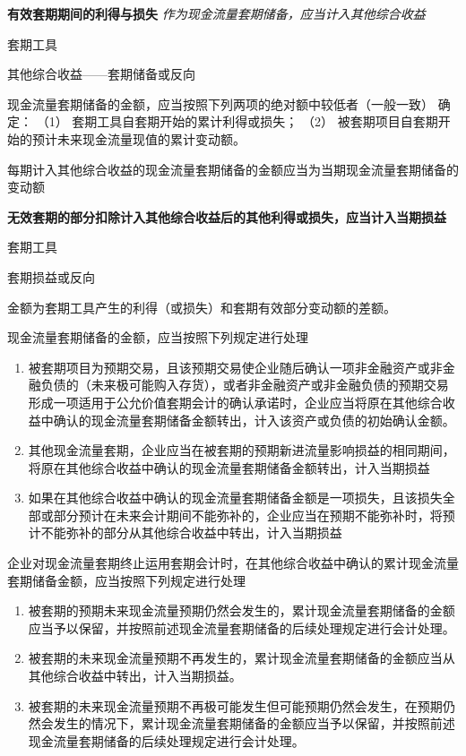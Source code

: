 \documentclass[UTF8,12pt]{ctexart}
\newenvironment{Dr}{%
	\begin{list}{}%
		{
			\setlength{\leftmargin}{2em}
			\setlength{\labelwidth}{2em}
			\setlength{\labelsep}{0pt}
			\setlength{\itemindent}{0pt}
			\setlength{\listparindent}{0pt}
			\setlength{\parsep}{0pt}
			\setlength{\topsep}{0pt}
		}
		\item[\textbf{借：}]
	}{%
	\end{list}
}
\newenvironment{Cr}{%
	\begin{list}{}%
		{
			\setlength{\leftmargin}{2em}
			\setlength{\labelwidth}{2em}
			\setlength{\labelsep}{0pt}
			\setlength{\itemindent}{0pt}
			\setlength{\listparindent}{0pt}
			\setlength{\parsep}{0pt}
			\setlength{\topsep}{0pt}
		}
		\item[\textbf{贷：}]
	}{%
	\end{list}
}
\numberwithin{equation}{section} %
\numberwithin{figure}{section}
\numberwithin{table}{section}
\begin{document}
	\textbf{有效套期期间的利得与损失}
	\textit{作为现金流量套期储备，应当计入其他综合收益}
	
	\begin{Dr}
		套期工具
	\end{Dr}
	\begin{Cr}
		其他综合收益——套期储备或反向
	\end{Cr}

	
	现金流量套期储备的金额，应当按照下列两项的绝对额中较低者（一般一致） 确定：
	（1）	套期工具自套期开始的累计利得或损失；
	（2）	被套期项目自套期开始的预计未来现金流量现值的累计变动额。
	
	每期计入其他综合收益的现金流量套期储备的金额应当为当期现金流量套期储备的变动额
	
	\textbf{无效套期的部分扣除计入其他综合收益后的其他利得或损失，应当计入当期损益}
	
	\begin{Dr}
		套期工具
	\end{Dr}
	\begin{Cr}
		套期损益或反向
	\end{Cr}
	
	金额为套期工具产生的利得（或损失）和套期有效部分变动额的差额。
	
	现金流量套期储备的金额，应当按照下列规定进行处理
	\begin{enumerate}
		\item 被套期项目为预期交易，且该预期交易使企业随后确认一项非金融资产或非金融负债的（未来极可能购入存货），或者非金融资产或非金融负债的预期交易形成一项适用于公允价值套期会计的确认承诺时，企业应当将原在其他综合收益中确认的现金流量套期储备金额转出，计入该资产或负债的初始确认金额。
		
		\item 其他现金流量套期，企业应当在被套期的预期新进流量影响损益的相同期间，将原在其他综合收益中确认的现金流量套期储备金额转出，计入当期损益
		
		\item 如果在其他综合收益中确认的现金流量套期储备金额是一项损失，且该损失全部或部分预计在未来会计期间不能弥补的，企业应当在预期不能弥补时，将预计不能弥补的部分从其他综合收益中转出，计入当期损益
	\end{enumerate}
	
	企业对现金流量套期终止运用套期会计时，在其他综合收益中确认的累计现金流量套期储备金额，应当按照下列规定进行处理
	\begin{enumerate}
		\item 被套期的预期未来现金流量预期仍然会发生的，累计现金流量套期储备的金额应当予以保留，并按照前述现金流量套期储备的后续处理规定进行会计处理。
		
		\item 被套期的未来现金流量预期不再发生的，累计现金流量套期储备的金额应当从其他综合收益中转出，计入当期损益。
		
		\item 被套期的未来现金流量预期不再极可能发生但可能预期仍然会发生，在预期仍然会发生的情况下，累计现金流量套期储备的金额应当予以保留，并按照前述现金流量套期储备的后续处理规定进行会计处理。
	\end{enumerate}
	
\end{document}
